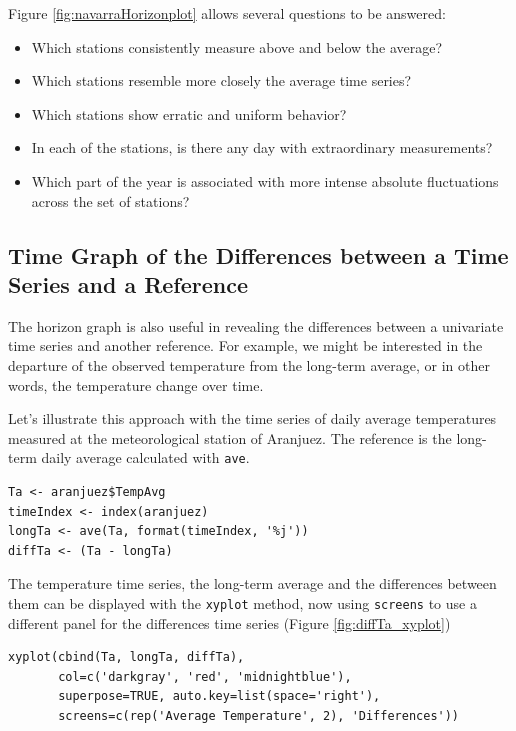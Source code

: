 \documentclass[smallroyalvopaper]{memoir}
\begin{document}
Figure \ref{fig:navarraHorizonplot} allows several questions to be
answered:
\begin{itemize}
\item Which stations consistently measure above and below the average?
\item Which stations resemble more closely the average time series?
\item Which stations show erratic and uniform behavior?
\item In each of the stations, is there any day with extraordinary measurements?
\item Which part of the year is associated with more intense
absolute fluctuations across the set of stations?
\end{itemize}
\subsection{Time Graph of the Differences between a Time Series and a Reference}
\label{sec-2-3}
The horizon graph is also useful in revealing the differences between
a univariate time series and another reference. For example, we
might be interested in the departure of the observed temperature
from the long-term average, or in other words, the temperature
change over time.

Let's illustrate this approach with the time series of daily
average temperatures measured at the meteorological station of
Aranjuez. The reference is the long-term daily average calculated
with \texttt{ave}.

\lstset{language=R,numbers=none}
\begin{lstlisting}
Ta <- aranjuez$TempAvg
timeIndex <- index(aranjuez)
longTa <- ave(Ta, format(timeIndex, '%j'))
diffTa <- (Ta - longTa)
\end{lstlisting}


The temperature time series, the long-term average and the
differences between them can be displayed with the \texttt{xyplot}
method, now using \texttt{screens} to use a different panel for the
differences time series (Figure \ref{fig:diffTa_xyplot})
\lstset{language=R,numbers=none}
\begin{lstlisting}
xyplot(cbind(Ta, longTa, diffTa),
       col=c('darkgray', 'red', 'midnightblue'),
       superpose=TRUE, auto.key=list(space='right'),
       screens=c(rep('Average Temperature', 2), 'Differences'))
\end{lstlisting}
\end{document}
